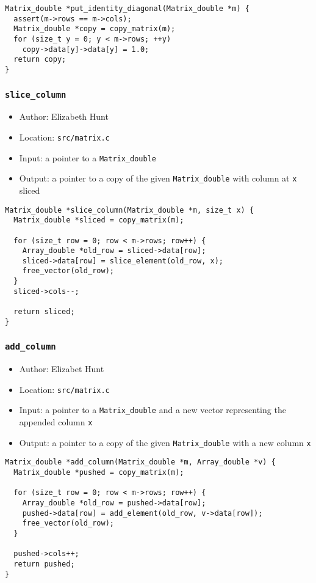 \documentclass[11pt]{article}
\begin{document}
\begin{verbatim}
Matrix_double *put_identity_diagonal(Matrix_double *m) {
  assert(m->rows == m->cols);
  Matrix_double *copy = copy_matrix(m);
  for (size_t y = 0; y < m->rows; ++y)
    copy->data[y]->data[y] = 1.0;
  return copy;
}
\end{verbatim}

\subsubsection{\texttt{slice\_column}}
\label{sec:org95e39ba}
\begin{itemize}
\item Author: Elizabeth Hunt
\item Location: \texttt{src/matrix.c}
\item Input: a pointer to a \texttt{Matrix\_double}
\item Output: a pointer to a copy of the given \texttt{Matrix\_double} with column at \texttt{x} sliced
\end{itemize}

\begin{verbatim}
Matrix_double *slice_column(Matrix_double *m, size_t x) {
  Matrix_double *sliced = copy_matrix(m);

  for (size_t row = 0; row < m->rows; row++) {
    Array_double *old_row = sliced->data[row];
    sliced->data[row] = slice_element(old_row, x);
    free_vector(old_row);
  }
  sliced->cols--;

  return sliced;
}
\end{verbatim}

\subsubsection{\texttt{add\_column}}
\label{sec:org9a2ad93}
\begin{itemize}
\item Author: Elizabet Hunt
\item Location: \texttt{src/matrix.c}
\item Input: a pointer to a \texttt{Matrix\_double} and a new vector representing the appended column \texttt{x}
\item Output: a pointer to a copy of the given \texttt{Matrix\_double} with a new column \texttt{x}
\end{itemize}

\begin{verbatim}
Matrix_double *add_column(Matrix_double *m, Array_double *v) {
  Matrix_double *pushed = copy_matrix(m);

  for (size_t row = 0; row < m->rows; row++) {
    Array_double *old_row = pushed->data[row];
    pushed->data[row] = add_element(old_row, v->data[row]);
    free_vector(old_row);
  }

  pushed->cols++;
  return pushed;
}
\end{verbatim}
\end{document}
